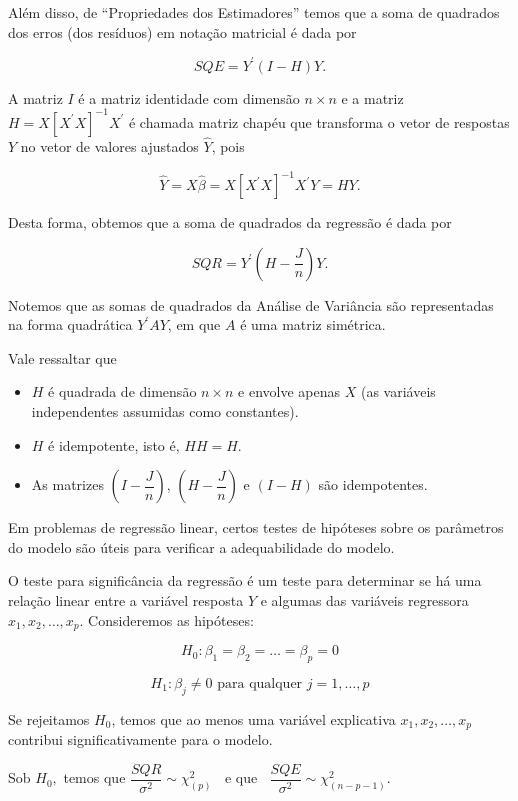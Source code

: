 \documentclass[
]{book}
\providecommand{\tightlist}{%
  \setlength{\itemsep}{0pt}\setlength{\parskip}{0pt}}
\begin{document}
Além disso, de ``Propriedades dos Estimadores'' temos que a soma de quadrados dos erros (dos resíduos) em notação matricial é dada por

\[SQE=Y^\prime(I-H)Y.\]

A matriz \(I\) é a matriz identidade com dimensão \(n\times n\) e a matriz \(H=X [X^\prime X]^{-1}X^\prime\) é chamada matriz chapéu que transforma o vetor de respostas \(Y\) no vetor de valores ajustados \(\widehat{Y}\), pois

\[\widehat{Y}=X\widehat{\beta}=X[X^\prime X]^{-1}X^\prime Y=HY.\]

Desta forma, obtemos que a soma de quadrados da regressão é dada por

\[SQR=Y^\prime \left(H-\dfrac{J}{n}\right)Y.\]

Notemos que as somas de quadrados da Análise de Variância são representadas na forma quadrática \(Y^\prime AY\), em que \(A\) é uma matriz simétrica.

Vale ressaltar que

\begin{itemize}
\tightlist
\item
  \(H\) é quadrada de dimensão \(n \times n\) e envolve apenas \(X\) (as variáveis independentes assumidas como constantes).
\item
  \(H\) é idempotente, isto é, \(HH=H\).
\item
  As matrizes \(\left(I-\dfrac{J}{n}\right)\), \(\left(H-\dfrac{J}{n}\right)\) e \((I-H)\) são idempotentes.
\end{itemize}

Em problemas de regressão linear, certos testes de hipóteses sobre os parâmetros do modelo são úteis para verificar a adequabilidade do modelo.

O teste para significância da regressão é um teste para determinar se há uma relação linear entre a variável resposta \(Y\) e algumas das variáveis regressora \(x_1,x_2,\dots,x_p\). Consideremos as hipóteses:

\[H_0:\beta_1=\beta_2=\ldots=\beta_p=0\]

\[H_1:\beta_j \neq 0 \text{ para qualquer } j=1,\ldots,p\]

Se rejeitamos \(H_0\), temos que ao menos uma variável explicativa \(x_1,x_2,\dots,x_p\) contribui significativamente para o modelo.

Sob \(H_0,\) temos que \(\dfrac{SQR}{\sigma^2} \sim \chi^2_{(p)}~~~~\mbox{e que}~~~~\dfrac{SQE}{\sigma^2} \sim \chi^2_{(n-p-1)}.\)
\end{document}
